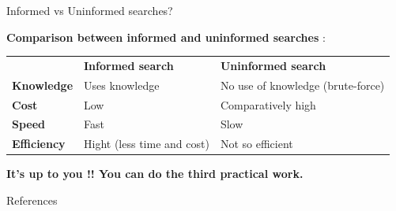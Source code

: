 \documentclass[9pt]{beamer}
\begin{document}
\begin{frame}{Informed vs Uninformed searches?}
\begin{small}

\textbf{Comparison between informed and uninformed searches} \cite{Russell2002}:

\begin{tabular}{l l l}
 & \textbf{Informed search} & \textbf{Uninformed search}\\
\textbf{Knowledge} & Uses knowledge & No use of knowledge (brute-force)\\
\textbf{Cost} & Low & Comparatively high\\
\textbf{Speed} & Fast & Slow\\
\textbf{Efficiency} & Hight (less time and cost) & Not so efficient\\
\end{tabular}

\end{small}
\end{frame}

\begin{frame}
\begin{center}
\textbf{\textcolor{CS-1light}{It's up to you !! You can do the third practical work.}}
\end{center}
\end{frame}

\begingroup
{}
\appendix

\begin{frame}[allowframebreaks]{References}
	\tiny
	
	
\end{frame}
\endgroup
\end{document}
